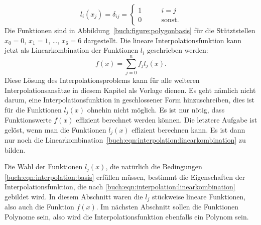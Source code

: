 \begin{equation}
l_i(x_j) = \delta_{ij} =\begin{cases}
1&\qquad i=j\\
0&\qquad\text{sonst.}
\end{cases}
\label{buch:eqn:interpolation:basis}
\end{equation}
Die Funktionen sind in Abbildung~\ref{buch:figure:polygonbasis} für
die Stütztstellen $x_0=0$, $x_1=1$, \dots , $x_6=6$ dargestellt.
Die lineare Interpolationsfunktion kann jetzt als Linearkombination
der Funktionen $l_i$ geschrieben werden:
\begin{equation}
f(x)
=
\sum_{j=0}^n f_j l_j(x).
\label{buch:eqn:interpolation:linearkombination}
\end{equation}
Diese Lösung des Interpolationsproblems kann für alle weiteren
Interpolationsansätze in diesem Kapitel als Vorlage dienen.
Es geht nämlich nicht darum, eine Interpolationsfunktion in
geschlossener Form hinzuschreiben, dies ist für die Funktionen $l_j(x)$
ohnehin nicht möglich.
Es ist nur nötig, dass Funktionswerte $f(x)$ effizient berechnet
werden können.
Die letztere Aufgabe ist gelöst, wenn man die Funktionen $l_j(x)$
effizient berechnen kann.
Es ist dann nur noch die
Linearkombination~\eqref{buch:eqn:interpolation:linearkombination}
zu bilden.

Die Wahl der Funktionen $l_j(x)$, die natürlich die Bedingungen
\eqref{buch:eqn:interpolation:basis} erfüllen müssen,
bestimmt die Eigenschaften der
Interpolationsfunktion, die nach 
\eqref{buch:eqn:interpolation:linearkombination}
gebildet wird.
In diesem Abschnitt waren die $l_j$ stückweise lineare Funktionen,
also auch die Funktion $f(x)$.
%
Im nächsten Abschnitt sollen die Funktionen Polynome sein,
also wird die Interpolationsfunktion ebenfalls ein Polynom sein.






